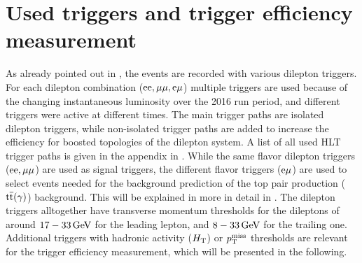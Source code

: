 \section{Used triggers and trigger efficiency measurement}\label{sec:triggEff}
As already pointed out in , the events are recorded with various dilepton triggers. For each dilepton combination ($\mathrm{e}\mathrm{e},{\mu}{\mu},\mathrm{e}{\mu}$) multiple triggers are used because of the changing instantaneous luminosity over the 2016 run period, and different triggers were active at different times. The main trigger paths are isolated dilepton triggers, while non-isolated trigger paths are added to increase the efficiency for boosted topologies of the dilepton system. A list of all used HLT trigger paths is given in the appendix in . While the same flavor dilepton triggers ($\mathrm{e}\mathrm{e},{\mu}{\mu}$) are used as signal triggers, the different flavor triggers ($\mathrm{e}{\mu}$) are used to select events needed for the background prediction of the top pair production (${\mathrm{t}\overline{\mathrm{t}}}(\gamma)$) background. This will be explained in more in detail in . The dilepton triggers alltogether have transverse momentum thresholds for the dileptons of around $17-33\,\text{Ge\hspace{-.08em}V}$ for the leading lepton, and $8-33\,\text{Ge\hspace{-.08em}V}$ for the trailing one. Additional triggers with hadronic activity ($H_{\mathrm{T}}$) or $p_{\mathrm{T}}^\text{miss}$ thresholds are relevant for the trigger efficiency measurement, which will be presented in the following.
